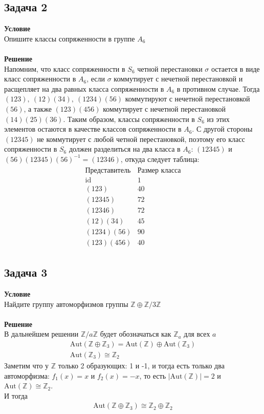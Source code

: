 		\subsection*{\textbf{Задача 2}}
		\textbf{Условие}\\
		Опишите классы сопряженности в группе $A_6$\\
		\\
		\textbf{Решение}\\
		Напомним, что класс сопряженности в $S_6$ четной перестановки $\sigma$ остается в виде класс сопряженности в $A_6$, если $\sigma$ коммутирует с нечетной перестановкой и расщепляет на два равных класса сопряженности в $A_6$ в противном случае. Тогда $(123),\ (12)(34),\ (1234)(56)$ коммутируют с нечетной перестановкой $(56)$, а также $(123)(456)$ коммутирует с нечетной перестановкой $(14)(25)(36)$. Таким образом, классы сопряженности в $S_6$ из этих элементов остаются в качестве классов сопряженности в $A_6$. С другой стороны $(12345)$ не коммутирует с любой четной перестановкой, поэтому его класс сопряженности в $S_6$ должен разделиться на два класса в $A_6$: $(12345)$ и $(56)(12345)(56)^{-1} = (12346)$, откуда следует таблица:
		\begin{gather*}
			\begin{matrix}
				\text{Представитель} & \text{Размер класса}\\
				\text{id} & 1\\
				(123) & 40\\
				(12345) & 72\\
				(12346) & 72\\
				(12)(34) & 45\\
				(1234)(56) & 90\\
				(123)(456) & 40
			\end{matrix}
		\end{gather*}


		\subsection*{\textbf{Задача 3}}
		\textbf{Условие}\\
		Найдите группу автоморфизмов группы $\mathbb{Z} \oplus \mathbb{Z} \slash 3\mathbb{Z}$\\
		\\
		\textbf{Решение}\\
		В дальнейшем решении $\mathbb{Z} \slash a \mathbb{Z}$ будет обозначаться как $\mathbb{Z}_a$ для всех $a$\\
		\begin{gather*}
			\text{Aut}(\mathbb{Z} \oplus \mathbb{Z}_3) = \text{Aut}(\mathbb{Z}) \oplus \text{Aut}(\mathbb{Z}_3)\\
			\text{Aut}(\mathbb{Z}_3) \cong \mathbb{Z}_2
		\end{gather*}
		Заметим что у $\mathbb{Z}$ только 2 образующих: 1 и -1, и тогда есть только два автоморфизма: $f_1(x) = x$ и $f_2(x) = -x$, то есть $|\text{Aut}(\mathbb{Z})| = 2$ и $\text{Aut}(\mathbb{Z}) \cong \mathbb{Z}_2$.\\
		И тогда
		\begin{gather*}
			\text{Aut}(\mathbb{Z} \oplus \mathbb{Z}_3) \cong \mathbb{Z}_2 \oplus \mathbb{Z}_2
		\end{gather*}
		\\
		\newpage
